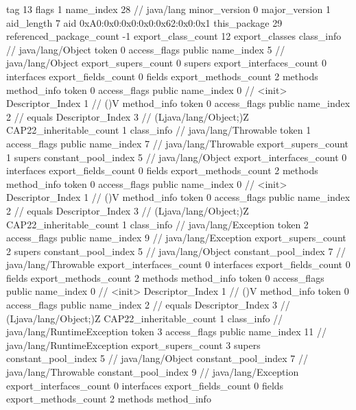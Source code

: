 {{{			tag	13
			flags	1
			name_index	28		// java/lang
			minor_version	0
			major_version	1
			aid_length	7
			aid	0xA0:0x0:0x0:0x0:0x62:0x0:0x1
		}
	}
	this_package	29
	referenced_package_count	-1
	export_class_count	12
	export_classes {
		class_info {		// java/lang/Object
			token	0
			access_flags	public
			name_index	5		// java/lang/Object
			export_supers_count	0
			supers {
			}
			export_interfaces_count	0
			interfaces {
			}
			export_fields_count	0
			fields {
			}
			export_methods_count	2
			methods {
				method_info {
					token	0
					access_flags	public
					name_index	0		// <init>
					Descriptor_Index	1		// ()V
				}
				method_info {
					token	0
					access_flags	public
					name_index	2		// equals
					Descriptor_Index	3		// (Ljava/lang/Object;)Z
				}
			}
			CAP22_inheritable_count	1
		}
		class_info {		// java/lang/Throwable
			token	1
			access_flags	public
			name_index	7		// java/lang/Throwable
			export_supers_count	1
			supers {
				constant_pool_index	5		// java/lang/Object
			}
			export_interfaces_count	0
			interfaces {
			}
			export_fields_count	0
			fields {
			}
			export_methods_count	2
			methods {
				method_info {
					token	0
					access_flags	public
					name_index	0		// <init>
					Descriptor_Index	1		// ()V
				}
				method_info {
					token	0
					access_flags	public
					name_index	2		// equals
					Descriptor_Index	3		// (Ljava/lang/Object;)Z
				}
			}
			CAP22_inheritable_count	1
		}
		class_info {		// java/lang/Exception
			token	2
			access_flags	public
			name_index	9		// java/lang/Exception
			export_supers_count	2
			supers {
				constant_pool_index	5		// java/lang/Object
				constant_pool_index	7		// java/lang/Throwable
			}
			export_interfaces_count	0
			interfaces {
			}
			export_fields_count	0
			fields {
			}
			export_methods_count	2
			methods {
				method_info {
					token	0
					access_flags	public
					name_index	0		// <init>
					Descriptor_Index	1		// ()V
				}
				method_info {
					token	0
					access_flags	public
					name_index	2		// equals
					Descriptor_Index	3		// (Ljava/lang/Object;)Z
				}
			}
			CAP22_inheritable_count	1
		}
		class_info {		// java/lang/RuntimeException
			token	3
			access_flags	public
			name_index	11		// java/lang/RuntimeException
			export_supers_count	3
			supers {
				constant_pool_index	5		// java/lang/Object
				constant_pool_index	7		// java/lang/Throwable
				constant_pool_index	9		// java/lang/Exception
			}
			export_interfaces_count	0
			interfaces {
			}
			export_fields_count	0
			fields {
			}
			export_methods_count	2
			methods {
				method_info {
}}}}}

